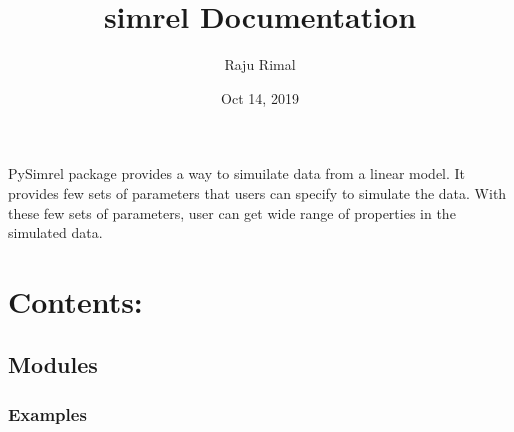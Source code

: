 \documentclass[letterpaper,10pt,english]{sphinxmanual}
\title{simrel Documentation}
\date{Oct 14, 2019}
\author{Raju Rimal}
\begin{document}
\pagestyle{empty}
\sphinxmaketitle
\pagestyle{plain}
\sphinxtableofcontents
\pagestyle{normal}
\label{\detokenize{index::doc}}


PySimrel package provides a way to simuilate data from a linear model. It provides few sets of parameters that users can specify to simulate the data. With these few sets of parameters, user can get wide range of properties in the simulated data.


\chapter{Contents:}
\label{\detokenize{index:contents}}

\section{Modules}
\label{\detokenize{Modules:modules}}\label{\detokenize{Modules::doc}}

\subsection{Examples}
\label{\detokenize{Modules:examples}}
\begin{sphinxVerbatim}[commandchars=\\\{\}]
          
\end{sphinxVerbatim}
\end{document}
